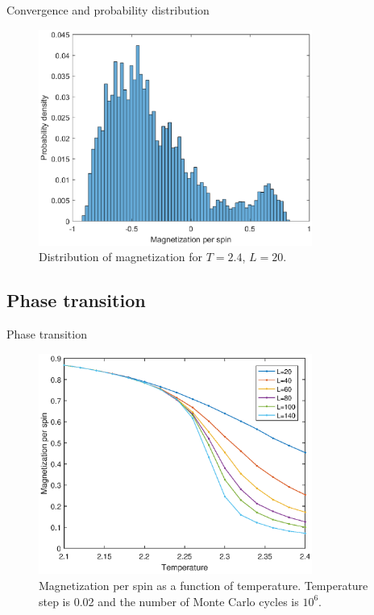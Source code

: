 \documentclass{beamer}
\begin{document}
\begin{frame}{Convergence and probability distribution}
\begin{figure}
\includegraphics[width=0.8\textwidth]{Prob_mag_highT.eps}
\caption{Distribution of magnetization for $T=2.4$, $L=20$. }
\end{figure}
\end{frame}

\subsection{Phase transition}
\begin{frame}{Phase transition}
\begin{figure}
	\includegraphics[width=0.8\textwidth]{Tran_mag.eps}
	\caption{Magnetization per spin as a function of temperature. Temperature step is 0.02 and the number of Monte Carlo cycles is $10^6$.  }
\end{figure}
\end{frame}
\end{document}
